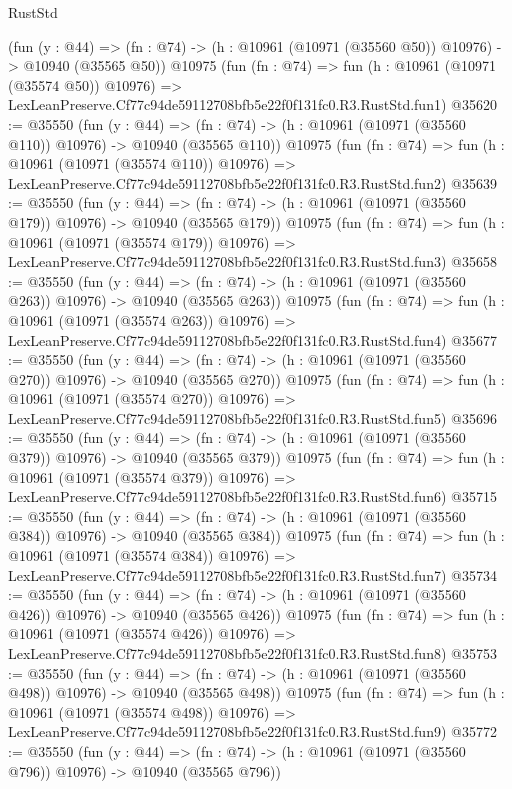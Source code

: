 \begin{lexlean}{RustStd}
\begin{coremodule}
    (fun (y : @44) =>
    (fn : @74) -> (h : @10961 (@10971 (@35560 @50)) @10976) -> @10940 (@35565 @50))
    @10975
    (fun (fn : @74) =>
    fun (h : @10961 (@10971 (@35574 @50)) @10976) =>
    LexLeanPreserve.Cf77c94de59112708bfb5e22f0f131fc0.R3.RustStd.fun1)
@35620 := @35550
    (fun (y : @44) =>
    (fn : @74) -> (h : @10961 (@10971 (@35560 @110)) @10976) -> @10940 (@35565 @110))
    @10975
    (fun (fn : @74) =>
    fun (h : @10961 (@10971 (@35574 @110)) @10976) =>
    LexLeanPreserve.Cf77c94de59112708bfb5e22f0f131fc0.R3.RustStd.fun2)
@35639 := @35550
    (fun (y : @44) =>
    (fn : @74) -> (h : @10961 (@10971 (@35560 @179)) @10976) -> @10940 (@35565 @179))
    @10975
    (fun (fn : @74) =>
    fun (h : @10961 (@10971 (@35574 @179)) @10976) =>
    LexLeanPreserve.Cf77c94de59112708bfb5e22f0f131fc0.R3.RustStd.fun3)
@35658 := @35550
    (fun (y : @44) =>
    (fn : @74) -> (h : @10961 (@10971 (@35560 @263)) @10976) -> @10940 (@35565 @263))
    @10975
    (fun (fn : @74) =>
    fun (h : @10961 (@10971 (@35574 @263)) @10976) =>
    LexLeanPreserve.Cf77c94de59112708bfb5e22f0f131fc0.R3.RustStd.fun4)
@35677 := @35550
    (fun (y : @44) =>
    (fn : @74) -> (h : @10961 (@10971 (@35560 @270)) @10976) -> @10940 (@35565 @270))
    @10975
    (fun (fn : @74) =>
    fun (h : @10961 (@10971 (@35574 @270)) @10976) =>
    LexLeanPreserve.Cf77c94de59112708bfb5e22f0f131fc0.R3.RustStd.fun5)
@35696 := @35550
    (fun (y : @44) =>
    (fn : @74) -> (h : @10961 (@10971 (@35560 @379)) @10976) -> @10940 (@35565 @379))
    @10975
    (fun (fn : @74) =>
    fun (h : @10961 (@10971 (@35574 @379)) @10976) =>
    LexLeanPreserve.Cf77c94de59112708bfb5e22f0f131fc0.R3.RustStd.fun6)
@35715 := @35550
    (fun (y : @44) =>
    (fn : @74) -> (h : @10961 (@10971 (@35560 @384)) @10976) -> @10940 (@35565 @384))
    @10975
    (fun (fn : @74) =>
    fun (h : @10961 (@10971 (@35574 @384)) @10976) =>
    LexLeanPreserve.Cf77c94de59112708bfb5e22f0f131fc0.R3.RustStd.fun7)
@35734 := @35550
    (fun (y : @44) =>
    (fn : @74) -> (h : @10961 (@10971 (@35560 @426)) @10976) -> @10940 (@35565 @426))
    @10975
    (fun (fn : @74) =>
    fun (h : @10961 (@10971 (@35574 @426)) @10976) =>
    LexLeanPreserve.Cf77c94de59112708bfb5e22f0f131fc0.R3.RustStd.fun8)
@35753 := @35550
    (fun (y : @44) =>
    (fn : @74) -> (h : @10961 (@10971 (@35560 @498)) @10976) -> @10940 (@35565 @498))
    @10975
    (fun (fn : @74) =>
    fun (h : @10961 (@10971 (@35574 @498)) @10976) =>
    LexLeanPreserve.Cf77c94de59112708bfb5e22f0f131fc0.R3.RustStd.fun9)
@35772 := @35550
    (fun (y : @44) =>
    (fn : @74) -> (h : @10961 (@10971 (@35560 @796)) @10976) -> @10940 (@35565 @796))

\end{coremodule}
\end{lexlean}
